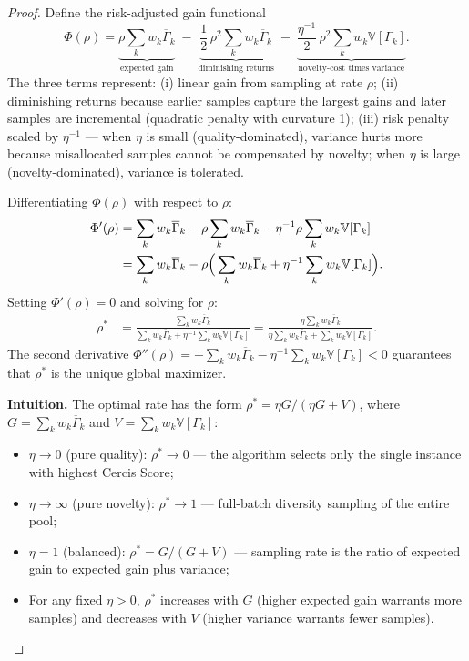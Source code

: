 \documentclass[12pt,a4paper]{article}
\newcommand{\V}{\mathbb{V}}
\begin{document}
\begin{proof}
Define the risk-adjusted gain functional
\begin{equation}\label{eq:risk-adj}
    \Phi(\rho) = \underbrace{\rho\sum_k w_k\overline{\Gamma}_k}_{\text{expected gain}}
    \;-\; \underbrace{\frac{1}{2}\,\rho^2\sum_k w_k\overline{\Gamma}_k}_{\text{diminishing returns}}
    \;-\; \underbrace{\frac{\eta^{-1}}{2}\,\rho^2\sum_k w_k\V[\Gamma_k]}_{\text{novelty-cost times variance}}.
\end{equation}
The three terms represent: (i) linear gain from sampling at rate $\rho$;
(ii) diminishing returns because earlier samples capture the largest gains
and later samples are incremental (quadratic penalty with curvature 1);
(iii) risk penalty scaled by $\eta^{-1}$ — when $\eta$ is small
(quality-dominated), variance hurts more because misallocated samples cannot
be compensated by novelty; when $\eta$ is large (novelty-dominated), variance
is tolerated.

Differentiating $\Phi(\rho)$ with respect to $\rho$:
\begin{align}
    \Phi'(\rho) &= \sum_k w_k\overline{\Gamma}_k
    - \rho\sum_k w_k\overline{\Gamma}_k
    - \eta^{-1}\rho\sum_k w_k\V[\Gamma_k] \notag\\
    &= \sum_k w_k\overline{\Gamma}_k
    - \rho\Big(\sum_k w_k\overline{\Gamma}_k
    + \eta^{-1}\sum_k w_k\V[\Gamma_k]\Big).
    \label{eq:phi-prime}
\end{align}
Setting $\Phi'(\rho)=0$ and solving for $\rho$:
\begin{align}
    \rho^* &= \frac{\sum_k w_k\overline{\Gamma}_k}
                  {\sum_k w_k\overline{\Gamma}_k
                   + \eta^{-1}\sum_k w_k\V[\Gamma_k]}
    = \frac{\eta\sum_k w_k\overline{\Gamma}_k}
           {\eta\sum_k w_k\overline{\Gamma}_k
            + \sum_k w_k\V[\Gamma_k]}.
    \label{eq:rho-derivation}
\end{align}
The second derivative
$\Phi''(\rho)=-\sum_k w_k\overline{\Gamma}_k-\eta^{-1}\sum_k w_k\V[\Gamma_k]<0$
guarantees that $\rho^*$ is the unique global maximizer.

\medskip\noindent
\textbf{Intuition.}
The optimal rate has the form $\rho^* = \eta G/(\eta G + V)$, where
$G=\sum_k w_k\overline{\Gamma}_k$ and $V=\sum_k w_k\V[\Gamma_k]$:
\begin{itemize}
    \item $\eta\to0$ (pure quality): $\rho^*\to0$ — the algorithm
          selects only the single instance with highest Cercis Score;
    \item $\eta\to\infty$ (pure novelty): $\rho^*\to1$ — full-batch
          diversity sampling of the entire pool;
    \item $\eta=1$ (balanced): $\rho^* = G/(G+V)$ — sampling rate
          is the ratio of expected gain to expected gain plus variance;
    \item For any fixed $\eta>0$, $\rho^*$ increases with $G$ (higher
          expected gain warrants more samples) and decreases with $V$
          (higher variance warrants fewer samples).
\end{itemize}
\end{proof}
\end{document}
